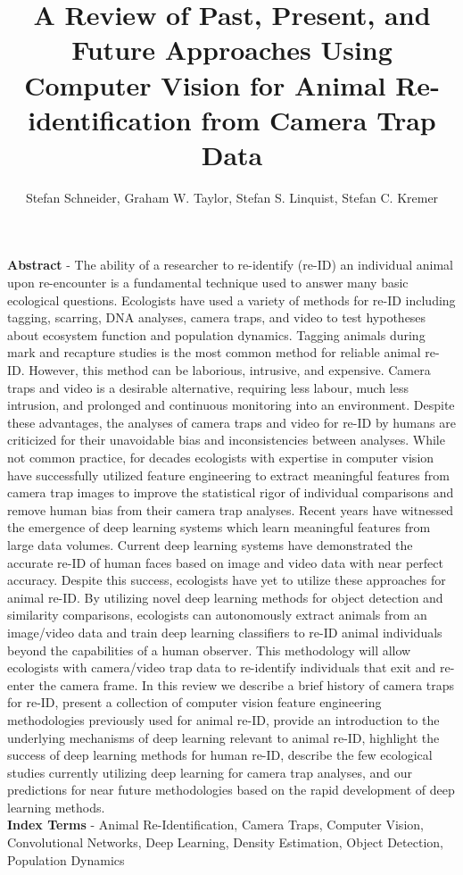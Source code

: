 \documentclass[11pt]{article}
\begin{document}
\title{A Review of Past, Present, and Future Approaches Using Computer Vision for Animal Re-identification from Camera Trap Data}

\author{Stefan Schneider, Graham W. Taylor, Stefan S. Linquist, Stefan C. Kremer}


\maketitle

\textbf{Abstract} - The ability of a researcher to re-identify (re-ID) an individual animal upon re-encounter is a fundamental technique used to answer many basic ecological questions. Ecologists have used a variety of methods for re-ID including tagging, scarring, DNA analyses, camera traps, and video to test hypotheses about ecosystem function and population dynamics. Tagging animals during mark and recapture studies is the most common method for reliable animal re-ID. However, this method can be laborious, intrusive, and expensive. Camera traps and video is a desirable alternative, requiring less labour, much less intrusion, and prolonged and continuous monitoring into an environment. Despite these advantages, the analyses of camera traps and video for re-ID by humans are criticized for their unavoidable bias and inconsistencies between analyses. While not common practice, for decades ecologists with expertise in computer vision have successfully utilized feature engineering to extract meaningful features from camera trap images to improve the statistical rigor of individual comparisons and remove human bias from their camera trap analyses. Recent years have witnessed the emergence of deep learning systems which learn meaningful features from large data volumes. Current deep learning systems have demonstrated the accurate re-ID of human faces based on image and video data with near perfect accuracy. Despite this success, ecologists have yet to utilize these approaches for animal re-ID. By utilizing novel deep learning methods for object detection and similarity comparisons, ecologists can autonomously extract animals from an image/video data and train deep learning classifiers to re-ID animal individuals beyond the capabilities of a human observer. This methodology will allow ecologists with camera/video trap data to re-identify individuals that exit and re-enter the camera frame. In this review we describe a brief history of camera traps for re-ID, present a collection of computer vision feature engineering methodologies previously used for animal re-ID, provide an introduction to the underlying mechanisms of deep learning relevant to animal re-ID, highlight the success of deep learning methods for human re-ID, describe the few ecological studies currently utilizing deep learning for camera trap analyses, and our predictions for near future methodologies based on the rapid development of deep learning methods.
\newline
\\
\textbf{Index Terms} - Animal Re-Identification, Camera Traps, Computer Vision, Convolutional Networks, Deep Learning, Density Estimation, Object Detection, Population Dynamics
\end{document}
